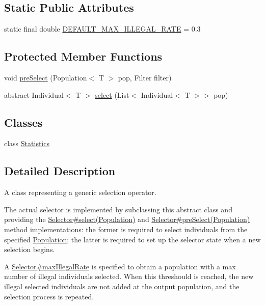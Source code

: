 \subsection*{Static Public Attributes}
\begin{CompactItemize}
\item 
static final double \hyperlink{classjenes_1_1stage_1_1operator_1_1_selector_3_01_t_01extends_01_chromosome_01_4_81263464a18d2ee1ecddf41f2e97fd89}{DEFAULT\_\-MAX\_\-ILLEGAL\_\-RATE} = 0.3
\end{CompactItemize}
\subsection*{Protected Member Functions}
\begin{CompactItemize}
\item 
void \hyperlink{classjenes_1_1stage_1_1operator_1_1_selector_3_01_t_01extends_01_chromosome_01_4_752bf2650cbb6760d2fbb68718d62328}{preSelect} (Population$<$ T $>$ pop, Filter filter)
\item 
abstract Individual$<$ T $>$ \hyperlink{classjenes_1_1stage_1_1operator_1_1_selector_3_01_t_01extends_01_chromosome_01_4_f6cf22a6d6e70ffd74ee1f042a16dcd9}{select} (List$<$ Individual$<$ T $>$$>$ pop)
\end{CompactItemize}
\subsection*{Classes}
\begin{CompactItemize}
\item 
class \hyperlink{classjenes_1_1stage_1_1operator_1_1_selector_3_01_t_01extends_01_chromosome_01_4_1_1_statistics}{Statistics}
\end{CompactItemize}


\subsection{Detailed Description}
A class representing a generic selection operator. 

The actual selector is implemented by subclassing this abstract class and providing the \hyperlink{}{Selector\#select(Population)} and \hyperlink{}{Selector\#preSelect(Population)} method implementations: the former is required to select individuals from the specified \hyperlink{}{Population}; the latter is required to set up the selector state when a new selection begins. 

A \hyperlink{}{Selector\#maxIllegalRate} is specified to obtain a population with a max number of illegal individuals selected. When this threshould is reached, the new illegal selected individuals are not added at the output population, and the selection process is repeated. 

